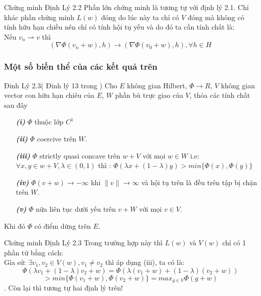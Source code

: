 \documentclass{beamer}
\begin{document}
\begin{frame}
\begin{block}{Chứng minh Định Lý 2.2}
Phần lớn chứng minh là tương tự với định lý 2.1. Chỉ khác phần chứng minh $L(w)$ đóng do lúc này ta chỉ có $V$ đóng mà không có tính hữu hạn chiều nên chỉ có tính hội tụ yếu và do đó ta cần tính chất là:\\
 Nếu $v_n \rightharpoonup v$ thì \[(\nabla \Phi(v_n+w), h ) \rightarrow (\nabla \Phi(v_0+w), h) ,\forall h \in H\] 

\end{block}
\end{frame}




\begin{frame}
\frametitle{Một số biến thể của các kết quả trên}
\begin{block}{Đinh Lý 2.3( Đinh lý 13 trong \cite{YJMM})}
Cho $E$ không gian Hilbert, $\Phi \rightarrow R$, $V$ không gian  vector con hữu hạn chiêu của $E$, $W$ phần bù trực giao của $V$, thỏa các tính chất sau đây
\begin{itemize}
\item[\textbf{\textit{(i)}}] $\Phi$ thuộc lớp $C^1$
\item[\textbf{\textit{(ii)}}]  $\Phi$ coercive trên $W$.
\item[\textbf{\textit{(iii)}}]  $\Phi$ strictly quasi concave trên $w+V$ với mọi $w\in W$ i.e:\\
$\forall x,y \in w+V , \lambda \in (0,1)$ thì : $\Phi(\lambda x+(1-\lambda)y)> min \{\Phi(x),\Phi(y)\}$
\item[\textbf{\textit{(iv)}}] $\Phi(v+w) \rightarrow -\infty$ khi $\|v\| \rightarrow \infty$ và hội tụ trên là đều trên tập bị chặn trên $W$.
\item[\textbf{\textit{(v)}}]  $\Phi$ nữa liên tục dưới yếu trên $v+W$ với mọi $v \in V$.
\end{itemize}
Khi đó $\Phi$ có điểm dừng trên $E$.
\end{block}
\end{frame}


\begin{frame}
\begin{block}{Chứng minh Định Lý 2.3}
Trong trường hợp này thì $L(w)$ và $V(w)$ chỉ có 1 phần tử bằng cách:\\
Gỉa sử: $\exists v_1,v_2\in V(w),v_1\neq v_2$ thì áp dụng (iii), ta có là:
$$\Phi(\lambda v_1+(1-\lambda)v_2+w)=\Phi(\lambda (v_1+w)+(1-\lambda)(v_2+w))$$
$$> min \{\Phi(v_1+w),\Phi(v_2+w)\}=max_{g\in V}\Phi(g+w)$$.
Còn lại thì tương tự hai định lý trên!
\end{block}
\end{frame}
\end{document}
